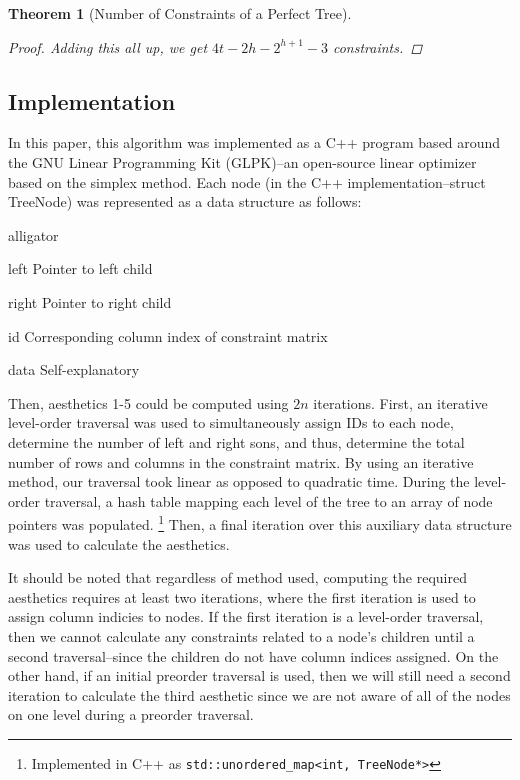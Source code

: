 \documentclass[11pt]{report}
\newtheorem{theorem}{Theorem}[section]
\begin{document}
\begin{theorem}[Number of Constraints of a Perfect Tree]
\begin{proof}
        \bigskip
        
        Adding this all up, we get $4t - 2h - 2^{h+1} - 3$ constraints.
    \end{proof}
\end{theorem}

\subsection{Implementation}
In this paper, this algorithm was implemented as a C++ program based around the GNU Linear Programming Kit (GLPK)--an open-source linear optimizer based on the simplex method.\cite{glpk} Each node (in the C++ implementation--struct TreeNode) was represented as a data structure as follows:

\begin{labeling}{alligator}
    \item [left]  Pointer to left child
    \item [right] Pointer to right child
    \item [id]    Corresponding column index of constraint matrix
    \item [data]  Self-explanatory
\end{labeling}

Then, aesthetics 1-5 could be computed using $2n$ iterations. First, an iterative level-order traversal was used to simultaneously assign IDs to each node, determine the number of left and right sons, and thus, determine the total number of rows and columns in the constraint matrix. By using an iterative method, our traversal took linear as opposed to quadratic time. During the level-order traversal, a hash table mapping each level of the tree to an array of node pointers was populated.
\footnote{Implemented in C++ as \lstinline{std::unordered_map<int, TreeNode*>}}
Then, a final iteration over this auxiliary data structure was used to calculate the aesthetics.

\bigskip

It should be noted that regardless of method used, computing the required aesthetics requires at least two iterations, where the first iteration is used to assign column indicies to nodes. If the first iteration is a level-order traversal, then we cannot calculate any constraints related to a node's children until a second traversal--since the children do not have column indices assigned. On the other hand, if an initial preorder traversal is used, then we will still need a second iteration to calculate the third aesthetic since we are not aware of all of the nodes on one level during a preorder traversal.
\end{document}
